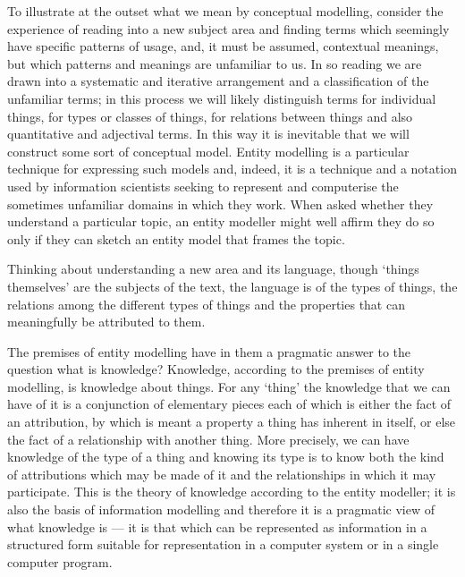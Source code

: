 To illustrate at the outset what we mean by conceptual modelling, consider the experience of reading into a new subject area and finding terms which seemingly have specific patterns of usage, and, it must be assumed, contextual meanings, but which patterns and meanings are unfamiliar to us. In so reading we are drawn into a systematic and iterative arrangement and a classification of the unfamiliar terms; in this process we will likely distinguish terms for individual things, for types or classes of things, for relations between things and also quantitative and adjectival terms. In this way it is inevitable that we will construct some sort of conceptual model. 
Entity modelling is a particular technique for expressing such models and, indeed, it is a technique and a notation used by information scientists seeking to represent and computerise the sometimes unfamiliar domains in which they work. When asked whether they understand a particular topic, an entity modeller might well affirm they do so only if they can sketch an entity model that frames the topic.

Thinking about understanding a new area and its language, though ‘things themselves’ are the subjects of the text, the language is of the types of things, the relations among the different types of things and the properties that can meaningfully be attributed to them. 

The premises of entity modelling have in them a pragmatic answer to the question what is knowledge? Knowledge, according to the premises of entity modelling, is knowledge about things. For any ‘thing’ the knowledge that we can have of it is a conjunction of elementary pieces each of which is either the fact of an attribution, by which is meant a property a thing has inherent in itself, or else the fact of a relationship with another thing. More precisely, we can have knowledge of the type of a thing and knowing its type is to know both the kind of attributions which may be made of it and the relationships in which it may participate. This is the theory of knowledge according to the entity modeller; it is also the basis of information modelling and therefore it is a pragmatic view of what knowledge is — it is that which can be represented as information in a structured form suitable for representation in a computer system or in a single computer program.

